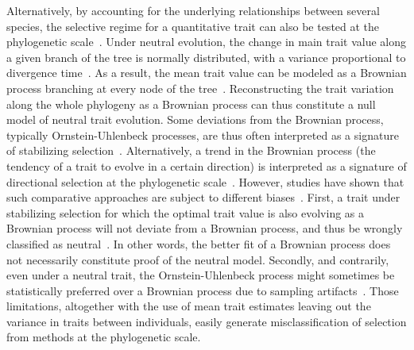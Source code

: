 \documentclass{article}
\begin{document}
Alternatively, by accounting for the underlying relationships between several species, the selective regime for a quantitative trait can also be tested at the phylogenetic scale~\parencite{felsenstein_phylogenies_1985}.
Under neutral evolution, the change in main trait value along a given branch of the tree is normally distributed, with a variance proportional to divergence time~\parencite{hansen_translating_1996}.
As a result, the mean trait value can be modeled as a Brownian process branching at every node of the tree~\parencite{hansen_translating_1996, harmon_phylogenetic_2018}.
Reconstructing the trait variation along the whole phylogeny as a Brownian process can thus constitute a null model of neutral trait evolution.
Some deviations from the Brownian process, typically Ornstein-Uhlenbeck processes, are thus often interpreted as a signature of stabilizing selection~\parencite{catalan_drift_2019}.
Alternatively, a trend in the Brownian process (the tendency of a trait to evolve in a certain direction) is interpreted as a signature of directional selection at the phylogenetic scale~\parencite{silvestro_early_2019}.
However, studies have shown that such comparative approaches are subject to different biases~\parencite{harmon_phylogenetic_2018}.
First, a trait under stabilizing selection for which the optimal trait value is also evolving as a Brownian process will not deviate from a Brownian process, and thus be wrongly classified as neutral~\parencite{hansen_translating_1996}.
In other words, the better fit of a Brownian process does not necessarily constitute proof of the neutral model.
Secondly, and contrarily, even under a neutral trait, the Ornstein-Uhlenbeck process might sometimes be statistically preferred over a Brownian process due to sampling artifacts~\parencite{silvestro_measurement_2015, cooper_cautionary_2016, price_detecting_2022}.
Those limitations, altogether with the use of mean trait estimates leaving out the variance in traits between individuals, easily generate misclassification of selection from methods at the phylogenetic scale.
\end{document}
